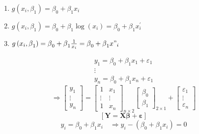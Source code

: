 \documentclass{article}
\begin{document}
\begin{enumerate}
\item $g\left( x_{i},\beta _{1}\right) =\beta _{0}+\beta _{1}x_{i}$

\item $g\left( x_{i},\beta _{1}\right) =\beta _{0}+\beta _{1}\log \left(
x_{i}\right) =\beta _{0}+\beta _{1}x_{i}^{\prime }$

\item $g\left( x_{i},\beta _{1}\right) =\beta _{0}+\beta _{1}\frac{1}{x_{i}}%
=\beta _{0}+\beta _{1}x"_{i}$
\end{enumerate}

\begin{equation*}
\begin{array}{c}
y_{1}=\beta _{0}+\beta _{1}x_{1}+\varepsilon _{1} \\ 
\vdots \\ 
y_{n}=\beta _{0}+\beta _{1}x_{n}+\varepsilon _{1}%
\end{array}%
\end{equation*}%
\begin{equation*}
\Rightarrow \left[ 
\begin{array}{c}
y_{1} \\ 
\vdots \\ 
y_{n}%
\end{array}%
\right] =\left[ 
\begin{array}{cc}
1 & x_{1} \\ 
\vdots & \vdots \\ 
1 & x_{n}%
\end{array}%
\right] _{n\times 2}\left[ 
\begin{array}{c}
\beta _{0} \\ 
\beta _{1}%
\end{array}%
\right] _{2\times 1}+\left[ 
\begin{array}{c}
\varepsilon _{1} \\ 
\vdots \\ 
\varepsilon _{n}%
\end{array}%
\right]
\end{equation*}%
\begin{equation*}
\left[ \mathbf{Y=X\beta +\varepsilon }\right]
\end{equation*}%
\begin{equation*}
y_{i}=\beta _{0}+\beta _{1}x_{i}\quad \Rightarrow y_{i}-\left( \beta
_{0}+\beta _{1}x_{i}\right) =0
\end{equation*}

\bigskip
\end{document}
